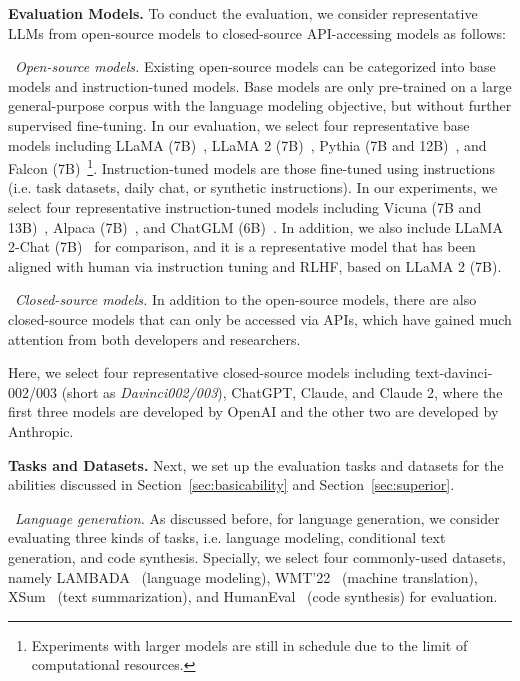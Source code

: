 {{\textbf{Evaluation Models.} To conduct the evaluation, we consider representative LLMs from open-source models to closed-source API-accessing models as follows:

\textbullet~\emph{Open-source models.} Existing open-source models can be categorized into base models and instruction-tuned models. Base models are only pre-trained on a large general-purpose corpus with the language modeling objective, but without further supervised fine-tuning. In our evaluation, we select four representative base models including LLaMA (7B)~\cite{Touvron-arxiv-2023-LLaMA}, LLaMA 2 (7B)~\cite{Touvron-2023-llama2-arxiv}, Pythia (7B and 12B)~\cite{Biderman-arxiv-2023-Pythia}, and Falcon (7B)~\cite{Ebtesam-arxiv-2023-Falcon}\footnote{Experiments with larger models are still in schedule due to the limit of computational resources. }. Instruction-tuned models are those fine-tuned using instructions (i.e. task datasets, daily chat, or synthetic instructions). In our experiments, we select four representative instruction-tuned models including Vicuna (7B and 13B)~\cite{vicuna2023}, Alpaca (7B)~\cite{alpaca}, and ChatGLM (6B)~\cite{Zeng-arxiv-2022-GLM}. {In addition, we also include LLaMA 2-Chat (7B)~\cite{Touvron-2023-llama2-arxiv} for comparison, and it is a representative model that has been aligned with human via instruction tuning and RLHF, based on LLaMA 2 (7B).}

\textbullet~\emph{Closed-source models.} In addition to the open-source models, there are also closed-source models that can only be accessed via APIs, which have gained much attention from both developers and researchers. 

Here, we select four representative closed-source models including text-davinci-002/003 (short as \emph{Davinci002/003}), ChatGPT, Claude, {and Claude 2, where the first three models are developed by OpenAI and the other two are developed by Anthropic.}

\textbf{Tasks and Datasets.} Next, we set up the evaluation tasks and datasets for the abilities discussed in  Section~\ref{sec:basicability} and Section~\ref{sec:superior}.  

\textbullet~\emph{Language generation.} As discussed before, for language generation, we consider evaluating three kinds of tasks, i.e. language modeling, conditional text generation, and code synthesis. Specially, we select four commonly-used datasets, namely LAMBADA~\cite{Paperno-ACL-2016-LAMBADA} (language modeling), WMT'22~\cite{Kocmi-WMT-2022-Findings} (machine translation), XSum~\cite{Naryan-EMNLP-2018-XSUM} (text summarization), and HumanEval~\cite{Chen-arxiv-2021-evaluating} (code synthesis) for evaluation. 

}}

